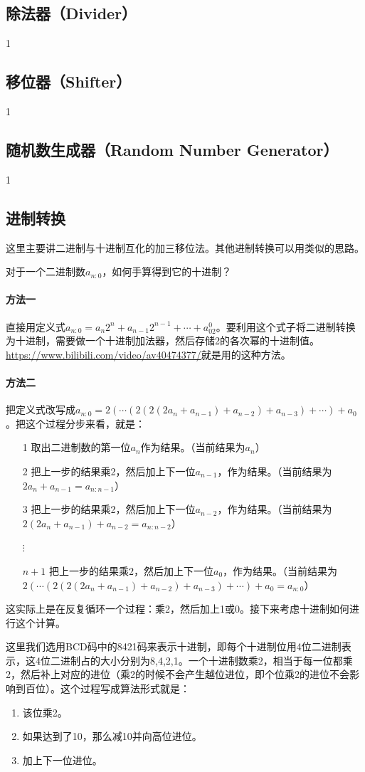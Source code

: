 \subsection{除法器（Divider）}
1
\subsection{移位器（Shifter）}
1
\subsection{随机数生成器（Random Number Generator）}
1
\subsection{进制转换}
这里主要讲二进制与十进制互化的加三移位法。其他进制转换可以用类似的思路。

对于一个二进制数$a_{n:0}$，如何手算得到它的十进制？

\paragraph*{方法一} 直接用定义式$a_{n:0}=a_n2^n+a_{n-1}2^{n-1}+\cdots+a_02^0$。要利用这个式子将二进制转换为十进制，需要做一个十进制加法器，然后存储2的各次幂的十进制值。\url{https://www.bilibili.com/video/av40474377/}就是用的这种方法。

\paragraph*{方法二} 把定义式改写成$a_{n:0}=2(\cdots(2(2(2a_n+a_{n-1})+a_{n-2})+a_{n-3})+\cdots)+a_0$。把这个过程分步来看，就是：
\begin{itemize}
\item[1] 取出二进制数的第一位$a_n$作为结果。（当前结果为$a_n$）
\item[2] 把上一步的结果乘2，然后加上下一位$a_{n-1}$，作为结果。（当前结果为$2a_n+a_{n-1}=a_{n:n-1}$）
\item[3] 把上一步的结果乘2，然后加上下一位$a_{n-2}$，作为结果。（当前结果为$2(2a_n+a_{n-1})+a_{n-2}=a_{n:n-2}$）
\item[$\vdots$]
\item[$n+1$] 把上一步的结果乘2，然后加上下一位$a_0$，作为结果。（当前结果为$2(\cdots(2(2(2a_n+a_{n-1})+a_{n-2})+a_{n-3})+\cdots)+a_0=a_{n:0}$）
\end{itemize}
这实际上是在反复循环一个过程：乘2，然后加上1或0。接下来考虑十进制如何进行这个计算。

这里我们选用BCD码中的8421码来表示十进制，即每个十进制位用4位二进制表示，这4位二进制占的大小分别为8,4,2,1。一个十进制数乘2，相当于每一位都乘2，然后补上对应的进位（乘2的时候不会产生越位进位，即个位乘2的进位不会影响到百位）。这个过程写成算法形式就是：
\begin{enumerate}
\item 该位乘2。
\item 如果达到了10，那么减10并向高位进位。
\item 加上下一位进位。
\end{enumerate}

